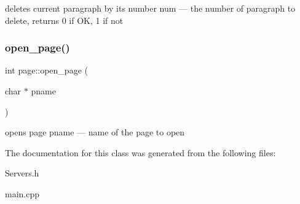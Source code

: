 deletes current paragraph by its number num --- the number of paragraph to delete, returns 0 if OK, 1 if not \mbox{\label{classpage_a5eae57fad910ef40d723c1808eeabad9}} 
\subsubsection{\texorpdfstring{open\+\_\+page()}{open\_page()}}
{\footnotesize\ttfamily int page\+::open\+\_\+page (\begin{DoxyParamCaption}\item[{char $\ast$}]{pname }\end{DoxyParamCaption})}

opens page pname --- name of the page to open 

The documentation for this class was generated from the following files\+:\begin{DoxyCompactItemize}
\item 
Servers.\+h\item 
main.\+cpp\end{DoxyCompactItemize}
